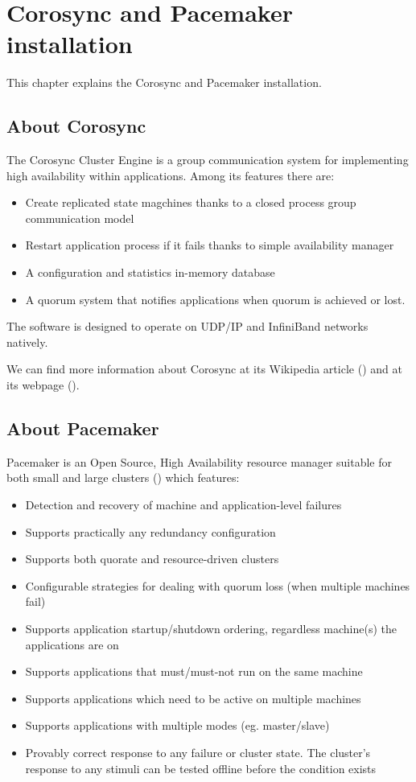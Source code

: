 

\chapter{Corosync and Pacemaker installation}
\label{chap:corosync-pacemaker-installation}
This chapter explains the Corosync and Pacemaker installation.

\section {About Corosync}
The Corosync Cluster Engine is a group communication system for implementing high availability within applications. Among its features there are:
\begin{itemize}
  \item Create replicated state magchines thanks to a closed process group communication model
  \item Restart application process if it fails thanks to simple availability manager
  \item A configuration and statistics in-memory database
  \item A quorum system that notifies applications when quorum is achieved or lost.
\end{itemize}


The software is designed to operate on UDP/IP and InfiniBand networks natively.

We can find more information about Corosync at its Wikipedia article (\cite{WikipediaCorosync}) and at its webpage (\cite{CorosyncWebpage}).

\section {\label{sec:about-pacemaker}About Pacemaker}

Pacemaker is an Open Source, High Availability resource manager suitable for both small and large clusters (\cite{PacemakerWebpage}) which features:
\begin{itemize}
  \item Detection and recovery of machine and application-level failures
  \item Supports practically any redundancy configuration
  \item Supports both quorate and resource-driven clusters
  \item Configurable strategies for dealing with quorum loss (when multiple machines fail)
  \item Supports application startup/shutdown ordering, regardless machine(s) the applications are on
  \item Supports applications that must/must-not run on the same machine
  \item Supports applications which need to be active on multiple machines
  \item Supports applications with multiple modes (eg. master/slave)
  \item Provably correct response to any failure or cluster state. The cluster's response to any stimuli can be tested offline before the condition exists
\end{itemize}

